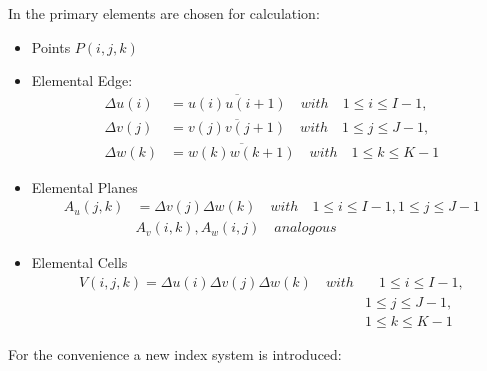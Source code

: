 In \cite{script_FeldSim} the primary elements are chosen for calculation:
\begin{itemize}
\item Points $P(i,j,k)$
\item Elemental Edge:
    \begin{align}
		\Delta u(i)&=\overline{u(i)u(i+1)}  \quad with  \quad 1\leq i \leq I-1, \nonumber\\
		\Delta v(j)&=\overline{v(j)v(j+1)}  \quad with  \quad 1\leq j \leq J-1, \nonumber\\
		\Delta w(k)&=\overline{w(k)w(k+1)}  \quad with  \quad 1\leq k \leq K-1
		\label{eq:discrete_edge}
		\end{align}
\item Elemental Planes
		\begin{align}
		A_{u}(j,k)&=\Delta v(j)\Delta w(k) \quad with  \quad 1\leq i \leq I-1,1\leq j \leq J-1\nonumber\\
		&A_{v}(i,k),A_{w}(i,j)  \quad analogous
		\label{eq:discrete_plane}
		\end{align}
\item Elemental Cells
		\begin{align}
		V(i,j,k)=\Delta u(i)\Delta v(j)\Delta w(k)  \quad with  &\quad 1\leq i\leq I-1,\nonumber\\
		&1\leq j\leq J-1,\nonumber\\
		&1\leq k\leq K-1
		\label{eq:discrete_cell}
		\end{align}
\end{itemize}
For the convenience a new index system is introduced:

